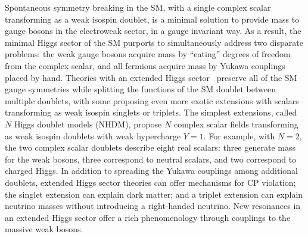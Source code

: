 Spontaneous symmetry breaking in the SM, with a single complex scalar transforming as a weak isospin doublet, is a minimal solution to provide mass to gauge bosons in the electroweak sector, in a gauge invariant way. As a result, the minimal Higgs sector of the SM purports to simultaneously address two disparate problems: the weak gauge bosons acquire mass by ``eating'' degrees of freedom from the complex scalar, and all fermions acquire mass by Yukawa couplings placed by hand.  Theories with an extended Higgs sector~\cite{extended_higgs_1, extended_higgs_2} preserve all of the SM gauge symmetries while splitting the functions of the SM doublet between multiple doublets, with some proposing even more exotic extensions with scalars transforming as weak isospin singlets or triplets. The simplest extensions, called $N$ Higgs doublet models (NHDM), propose $N$ complex scalar fields transforming as weak isospin doublets with weak hypercharge $Y=1$. For example, with $N=2$, the two complex scalar doublets describe eight real scalars: three generate mass for the weak bosons, three correspond to neutral scalars,
and two correspond to charged Higgs. In addition to spreading the Yukawa couplings among additional doublets, extended Higgs sector theories can offer mechanisms for CP violation; the singlet extension can explain dark matter;
and a triplet extension can explain neutrino masses without introducing a right-handed neutrino.
New resonances in an extended Higgs sector offer a rich phenomenology through couplings to the massive weak bosons.   


